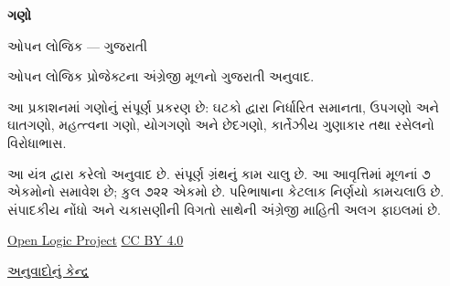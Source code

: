 \documentclass[11pt,a4paper]{article}
\theoremstyle{definition}
\begin{document}
\begin{titlepage}
{\Huge\bfseries ગણો\par}
\vspace{1em}
{\Large ઓપન લોજિક — ગુજરાતી\par}
\vspace{2em}
ઓપન લોજિક પ્રોજેક્ટના અંગ્રેજી મૂળનો ગુજરાતી અનુવાદ.\par
\vspace{1em}
આ પ્રકાશનમાં ગણોનું સંપૂર્ણ પ્રકરણ છે: ઘટકો દ્વારા નિર્ધારિત સમાનતા,
ઉપગણો અને ઘાતગણો, મહત્ત્વના ગણો, યોગગણો અને છેદગણો,
કાર્તેઝીય ગુણાકાર તથા રસેલનો વિરોધાભાસ.\par
\vfill
આ યંત્ર દ્વારા કરેલો અનુવાદ છે. સંપૂર્ણ ગ્રંથનું કામ ચાલુ છે.
આ આવૃત્તિમાં મૂળનાં ૭ એકમોનો સમાવેશ છે; કુલ ૭૨૨ એકમો છે.
પરિભાષાના કેટલાક નિર્ણયો કામચલાઉ છે. સંપાદકીય નોંધો અને
ચકાસણીની વિગતો સાથેની અંગ્રેજી માહિતી અલગ ફાઇલમાં છે.\par
\vspace{1em}
\href{https://github.com/OpenLogicProject/OpenLogic}{Open Logic Project}
\quad \href{https://creativecommons.org/licenses/by/4.0/}{CC BY 4.0}\par
\href{https://github.com/KokunoYumeto/OpenLogic-translations}{અનુવાદોનું કેન્દ્ર}\par
\end{titlepage}
\tableofcontents
\clearpage

\end{document}
